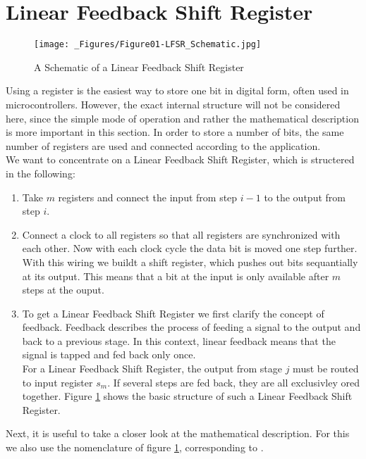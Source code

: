 \documentclass[a4paper,twoside, openright,12pt]{report}
\begin{document}
\section{Linear Feedback Shift Register}
\label{Section_LFSR}

\begin{figure}[h]
\begin{center}
\texttt{[image: \_Figures/Figure01-LFSR\_Schematic.jpg]}
\caption{A Schematic of a Linear Feedback Shift Register \cite{Paar.2016}}
\label{Schematic_LFSR}
\end{center}
\end{figure}

Using a register is the easiest way to store one bit in digital form, often used in microcontrollers. However, the exact internal structure will not be considered here, since the simple mode of operation and rather the mathematical description is more important in this section. In order to store a number of bits, the same number of registers are  used and connected according to the application. \\
We want to concentrate on a Linear Feedback Shift Register, which is structered in the following:
\begin{enumerate}
\item Take $m$ registers and connect the input from step $i-1$ to the output from step $i$.
\item Connect a clock to all registers so that all registers are synchronized with each other. Now with each clock cycle the data bit is moved one step further. With this wiring we buildt a shift register, which pushes out bits sequantially at its output. This means that a bit at the input is only available after $m$ steps at the ouput.
\item To get a Linear Feedback Shift Register we first clarify the concept of feedback. Feedback describes the process of feeding a signal to the output and back to a previous stage. In this context, linear feedback means that the signal is tapped and fed back only once. \\
For a Linear Feedback Shift Register, the output from stage $j$ must be routed to input register $s_m$. If several steps are fed back, they are all exclusivley ored together. Figure \ref{Schematic_LFSR} shows the basic structure of such a Linear Feedback Shift Register.
\end{enumerate}
Next, it is useful to take a closer look at the mathematical description. For this we also use the nomenclature of figure \ref{Schematic_LFSR}, corresponding to \cite{Paar.2016}. \\
\end{document}
